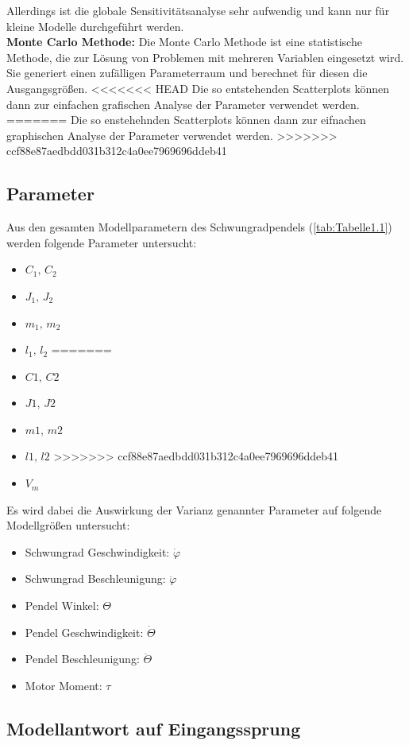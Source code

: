 Allerdings ist die globale Sensitivitätsanalyse sehr aufwendig und kann nur für kleine Modelle durchgeführt werden.\\

\textbf{Monte Carlo Methode:}
Die Monte Carlo Methode ist eine statistische Methode, die zur Lösung von Problemen mit mehreren Variablen eingesetzt wird.
Sie generiert einen zufälligen Parameterraum und berechnet für diesen die Ausgangsgrößen.
<<<<<<< HEAD
Die so entstehenden Scatterplots können dann zur einfachen grafischen Analyse der Parameter verwendet werden.
=======
Die so enstehehnden Scatterplots können dann zur eifnachen graphischen Analyse der Parameter verwendet werden.
>>>>>>> ccf88e87aedbdd031b312c4a0ee7969696ddeb41


\subsection{Parameter}
Aus den gesamten Modellparametern des Schwungradpendels (\ref{tab:Tabelle1.1}) werden folgende Parameter untersucht:
\begin{itemize}
<<<<<<< HEAD
    \item $C_1,\, C_2$
    \item $J_1,\, J_2$
    \item $m_1,\, m_2$
    \item $l_1,\, l_2$
=======
    \item $C1,\, C2$
    \item $J1,\, J2$
    \item $m1,\, m2$
    \item $l1,\, l2$
>>>>>>> ccf88e87aedbdd031b312c4a0ee7969696ddeb41
    \item $V_m$
\end{itemize}
Es wird dabei die Auswirkung der Varianz genannter Parameter auf folgende Modellgrößen untersucht:
\begin{itemize}
    \item Schwungrad Geschwindigkeit: $\dot\varphi$
    \item Schwungrad Beschleunigung: $\ddot\varphi$
    \item Pendel Winkel: $\Theta$
    \item Pendel Geschwindigkeit: $\dot\Theta$
    \item Pendel Beschleunigung: $\ddot\Theta$
    \item Motor Moment: $\tau$
\end{itemize}


\subsection*{Modellantwort auf Eingangssprung}

